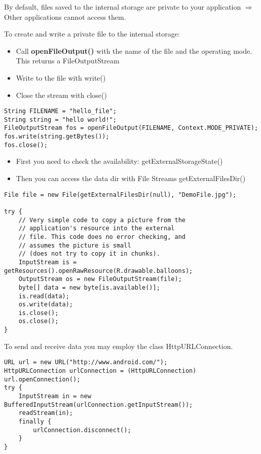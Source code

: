 \begin{breakbox}

By default, files saved to the internal storage are private to your
application $\Rightarrow$ Other applications cannot access them.

To create and write a private file to the internal storage: 
\begin{itemize}
    \item Call
\textbf{openFileOutput()} with the name of the file and the operating
mode. This returns a FileOutputStream
\item Write to the file with write()
\item Close the stream with close()
\end{itemize}

\begin{lstlisting}
String FILENAME = "hello_file";
String string = "hello world!";
FileOutputStream fos = openFileOutput(FILENAME, Context.MODE_PRIVATE);
fos.write(string.getBytes());
fos.close();
\end{lstlisting}
\end{breakbox}

\begin{breakbox}

\begin{itemize}
\tightlist
\item
  First you need to check the availability: getExternalStorageState()
\item
  Then you can access the data dir with File Streams
  getExternalFilesDir()
\end{itemize}

\begin{lstlisting}
File file = new File(getExternalFilesDir(null), "DemoFile.jpg");

try {
    // Very simple code to copy a picture from the
    // application's resource into the external
    // file. This code does no error checking, and
    // assumes the picture is small
    // (does not try to copy it in chunks).
    InputStream is = getResources().openRawResource(R.drawable.balloons);
    OutputStream os = new FileOutputStream(file);
    byte[] data = new byte[is.available()];
    is.read(data);
    os.write(data);
    is.close();
    os.close();
}
\end{lstlisting}
\end{breakbox}

\columnbreak
\begin{breakbox}

To send and receive data you may employ the class HttpURLConnection.

\begin{lstlisting}
URL url = new URL("http://www.android.com/");
HttpURLConnection urlConnection = (HttpURLConnection) url.openConnection();
try {
    InputStream in = new BufferedInputStream(urlConnection.getInputStream());
    readStream(in);
    finally {
        urlConnection.disconnect();
    }
}
\end{lstlisting}
\end{breakbox}


